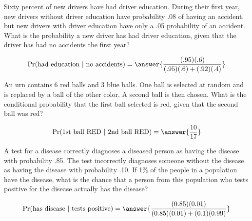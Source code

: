 \documentclass{ximera}
\begin{document}
\begin{problem}
Sixty percent of new drivers have had driver education. During their first year, new drivers without driver education have probability .08 of having an accident, but new drivers with driver education have only a .05 probability of an accident. What is the probability a new driver has had driver education, given that the driver has had no accidents the first year? 

\begin{prompt}%
$$\Pr(\text{had education }|\text{ no accidents})=\answer{\frac{(.95)(.6)}{(.95)(.6)+(.92)(.4)}}$$
\end{prompt}
\end{problem}


\begin{problem}
An urn contains 6 red balls and 3 blue balls. One ball is selected at random and is replaced by a ball of the other color. A second ball is then chosen. What is the conditional probability that the first ball selected is red, given that the second ball was red? 

\begin{prompt}
$$\Pr(\text{1st ball RED }|\text{ 2nd ball RED})=\answer{\frac{10}{17}}$$

\end{prompt}
\end{problem}



\begin{problem}
 A test for a disease correctly diagnoses a diseased person as having the disease with probability .85. The test incorrectly diagnoses someone without the disease as having the disease with probability .10. If 1\% of the people in a population have the disease, what is the chance that a person from this population who tests positive for the disease actually has the disease? 

\begin{prompt}
$$\Pr(\text{has disease }|\text{ tests positive})=\answer{ \frac{(0.85)(0.01)}{(0.85)(0.01)+(0.1)(0.99)}}$$
\end{prompt}
\end{problem}
\end{document}
